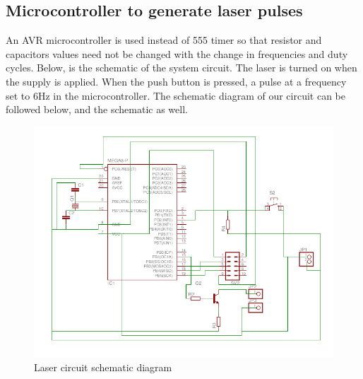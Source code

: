 \documentclass[12pt, a4paper]{article}
\begin{document}
\subsection{Microcontroller to generate laser pulses}

	An AVR microcontroller is used instead of 555 timer so that resistor and capacitors values need not be changed with the change in frequencies and duty cycles. Below, is the schematic of the system circuit. The laser is turned on when the supply is applied. When the push button is pressed, a pulse at a frequency set to 6Hz in the microcontroller. The schematic diagram of our circuit can be followed below, and the schematic as well.
	

\begin{figure}[htp]
	\centering
	\includegraphics[scale=0.55]{schematic.png}
	\caption{Laser circuit schematic diagram}
	\label{}
\end{figure}
\end{document}
